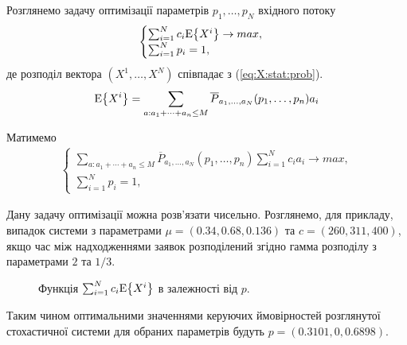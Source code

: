 \documentclass{KnuBulletin}
\begin{document}
\begin{multicols}{2}
    Розглянемо задачу оптимізації параметрів $p_1,\dots,p_N$  вхідного потоку
    \begin{gather*}
    \begin{cases}
        \sum_{i=1}^{N} c_i {{\rm E}{\left\{X^i\right\}}} \rightarrow max,\\
        \sum_{i=1}^{N} p_i=1,
    \end{cases}
    \end{gather*}
    де розподіл вектора $(X^1,\dots,X^N)$ співпадає з (\ref{eq:X:stat:prob}).
    \begin{gather*}
        {{\rm E}{\left\{X^i\right\}}} = \sum_{a:a_1+\cdots+a_n \le M} 
        \overline{P}_{a_1,\dots,a_N}(p_1,\dots,p_n) a_i
    \end{gather*}
        
    Матимемо
    \begin{gather*}
        \begin{cases}
            \sum_{a:a_1+\cdots+a_n \le M} 
            \overline{P}_{a_1,\dots,a_N}(p_1,\dots,p_n)
            \sum_{i=1}^{N} 
            c_i 
            a_i \rightarrow max,\\
            \sum_{i=1}^{N} p_i=1,
        \end{cases}
    \end{gather*}

    Дану задачу оптимізації можна розв'язати чисельно.
    Розглянемо, для прикладу, випадок системи з параметрами
    $\mu=(0.34, 0.68, 0.136)$ та
    $c=(260, 311, 400)$, 
    якщо час між надходженнями заявок розподілений згідно гамма розподілу з параметрами $2$ та $1/3$.
    
    \begin{figure}[H]
        \hfil
        
        \hfil
        \caption{Функція $\sum_{i=1}^{N} c_i {{\rm E}{\left\{X^i\right\}}}$ в залежності від $p$.}
        \label{fig:one2example}
    \end{figure}
        
    Таким чином оптимальними значеннями керуючих ймовірностей розглянутої стохастичної системи для обраних параметрів будуть $p=(0.3101, 0, 0.6898)$.
    
    
    

\end{multicols}
\end{document}
